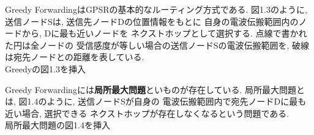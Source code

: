 Greedy ForwardingはGPSRの基本的なルーティング方式である.
図1.3のように, 送信ノードSは, 送信先ノードDの位置情報をもとに
自身の電波伝搬範囲内のノードから, Dに最も近いノードを
ネクストホップとして選択する. 点線で書かれた円は全ノードの
受信感度が等しい場合の送信ノードSの電波伝搬範囲を, 
破線は宛先ノードとの距離を表している.\\

{\LARGE Greedyの図1.3を挿入}

Greedy Forwardingには\textbf{局所最大問題}といものが存在している. 
局所最大問題とは, 図1.4のように, 送信ノードSが自身の
電波伝搬範囲内で宛先ノードDに最も近い場合, 選択できる
ネクストホップが存在しなくなるという問題である.\\

{\LARGE 局所最大問題の図1.4を挿入}

